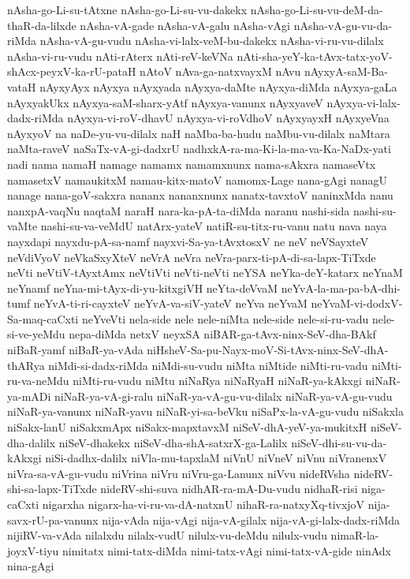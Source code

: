{nAsha-go-Li-su-tAtxne
nAsha-go-Li-su-vu-dakekx
nAsha-go-Li-su-vu-deM-da-thaR-da-lilxde
nAsha-vA-gade
nAsha-vA-galu
nAsha-vAgi
nAsha-vA-gu-vu-da-riMda
nAsha-vA-gu-vudu
nAsha-vi-lalx-veM-bu-dakekx
nAsha-vi-ru-vu-dilalx
nAsha-vi-ru-vudu
nAti-rAterx
nAti-reV-keVNa
nAti-sha-yeY-ka-tAvx-tatx-yoV-shAcx-peyxV-ka-rU-pataH
nAtoV
nAva-ga-natxvayxM
nAvu
nAyxyA-saM-Ba-vataH
nAyxyAyx
nAyxya
nAyxyada
nAyxya-daMte
nAyxya-diMda
nAyxya-gaLa
nAyxyakUkx
nAyxya-saM-sharx-yAtf
nAyxya-vanunx
nAyxyaveV
nAyxya-vi-lalx-dadx-riMda
nAyxya-vi-roV-dhavU
nAyxya-vi-roVdhoV
nAyxyayxH
nAyxyeVna
nAyxyoV
na
naDe-yu-vu-dilalx
naH
naMba-ba-hudu
naMbu-vu-dilalx
naMtara
naMta-raveV
naSaTx-vA-gi-dadxrU
nadhxkA-ra-ma-Ki-la-ma-va-Ka-NaDx-yati
nadi
nama
namaH
namage
namamx
namamxnunx
nama-sAkxra
namaseVtx
namasetxV
namaukitxM
namau-kitx-matoV
namomx-Lage
nana-gAgi
nanagU
nanage
nana-goV-sakxra
nananx
nananxnunx
nanatx-tavxtoV
naninxMda
nanu
nanxpA-vaqNu
naqtaM
naraH
nara-ka-pA-ta-diMda
naranu
nashi-sida
nashi-su-vaMte
nashi-su-va-veMdU
natArx-yateV
natiR-su-titx-ru-vanu
natu
nava
naya
nayxdapi
nayxdu-pA-sa-namf
nayxvi-Sa-ya-tAvxtosxV
ne
neV
neVSayxteV
neVdiVyoV
neVkaSxyXteV
neVrA
neVra
neVra-parx-ti-pA-di-sa-lapx-TiTxde
neVti
neVtiV-tAyxtAmx
neVtiVti
neVti-neVti
neYSA
neYka-deY-katarx
neYnaM
neYnamf
neYna-mi-tAyx-di-yu-kitxgiVH
neYta-deVvaM
neYvA-la-ma-pa-bA-dhi-tumf
neYvA-ti-ri-cayxteV
neYvA-va-siV-yateV
neYva
neYvaM
neYvaM-vi-dodxV-Sa-maq-caCxti
neYveVti
nela-side
nele
nele-niMta
nele-side
nele-si-ru-vadu
nele-si-ve-yeMdu
nepa-diMda
netxV
neyxSA
niBAR-ga-tAvx-ninx-SeV-dha-BAkf
niBaR-yamf
niBaR-ya-vAda
niHsheV-Sa-pu-Nayx-moV-Si-tAvx-ninx-SeV-dhA-thARya
niMdi-si-dadx-riMda
niMdi-su-vudu
niMta
niMtide
niMti-ru-vadu
niMti-ru-va-neMdu
niMti-ru-vudu
niMtu
niNaRya
niNaRyaH
niNaR-ya-kAkxgi
niNaR-ya-mADi
niNaR-ya-vA-gi-ralu
niNaR-ya-vA-gu-vu-dilalx
niNaR-ya-vA-gu-vudu
niNaR-ya-vanunx
niNaR-yavu
niNaR-yi-sa-beVku
niSaPx-la-vA-gu-vudu
niSakxla
niSakx-lanU
niSakxmApx
niSakx-mapxtavxM
niSeV-dhA-yeV-ya-mukitxH
niSeV-dha-dalilx
niSeV-dhakekx
niSeV-dha-shA-satxrX-ga-Lalilx
niSeV-dhi-su-vu-da-kAkxgi
niSi-dadhx-dalilx
niVla-mu-tapxlaM
niVnU
niVneV
niVnu
niVranenxV
niVra-sa-vA-gu-vudu
niVrina
niVru
niVru-ga-Lanunx
niVvu
nideRVsha
nideRV-shi-sa-lapx-TiTxde
nideRV-shi-suva
nidhAR-ra-mA-Du-vudu
nidhaR-risi
niga-caCxti
nigarxha
nigarx-ha-vi-ru-va-dA-natxnU
nihaR-ra-natxyXq-tivxjoV
nija-savx-rU-pa-vanunx
nija-vAda
nija-vAgi
nija-vA-gilalx
nija-vA-gi-lalx-dadx-riMda
nijiRV-va-vAda
nilalxdu
nilalx-vudU
nilulx-vu-deMdu
nilulx-vudu
nimaR-la-joyxV-tiyu
nimitatx
nimi-tatx-diMda
nimi-tatx-vAgi
nimi-tatx-vA-gide
ninAdx
nina-gAgi
}
